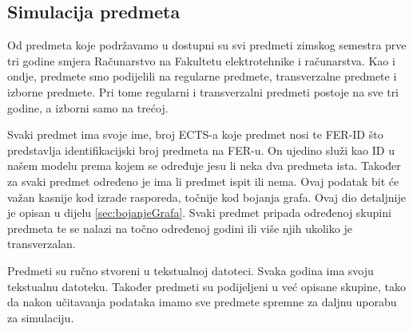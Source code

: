 \documentclass[times, utf8, zavrsni, numeric]{fer}
\begin{document}
\subsection*{Simulacija predmeta}
Od predmeta koje podržavamo u dostupni su svi predmeti zimskog semestra prve tri godine smjera Računarstvo na Fakultetu elektrotehnike i računarstva. Kao i ondje, predmete smo podijelili na regularne predmete, transverzalne predmete i izborne predmete. Pri tome regularni i transverzalni predmeti postoje na sve tri godine, a izborni samo na trećoj.\par
Svaki predmet ima svoje ime, broj ECTS-a koje predmet nosi te FER-ID što predstavlja identifikacijski broj predmeta na FER-u. On ujedino služi kao ID u našem modelu prema kojem se određuje jesu li neka dva predmeta ista. Također za svaki predmet određeno je ima li predmet ispit ili nema. Ovaj podatak bit će važan kasnije kod izrade rasporeda, točnije kod bojanja grafa. Ovaj dio detaljnije je opisan u dijelu \ref{sec:bojanjeGrafa}. Svaki predmet pripada određenoj skupini predmeta te se nalazi na točno određenoj godini ili više njih ukoliko je transverzalan.\par
Predmeti su ručno stvoreni u tekstualnoj datoteci. Svaka godina ima svoju tekstualnu datoteku. Također predmeti su podijeljeni u već opisane skupine, tako da nakon učitavanja podataka imamo sve predmete spremne za daljnu uporabu za simulaciju. 
\end{document}
